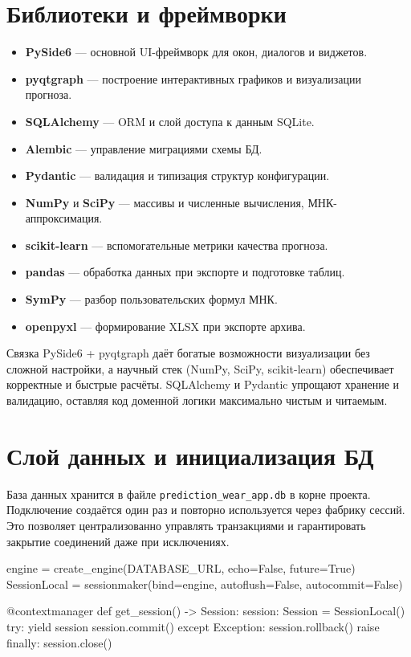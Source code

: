 \documentclass[12pt,a4paper]{article}
\begin{document}
\section*{Библиотеки и фреймворки}
\begin{itemize}
  \item \textbf{PySide6} --- основной UI-фреймворк для окон, диалогов и виджетов.
  \item \textbf{pyqtgraph} --- построение интерактивных графиков и визуализации прогноза.
  \item \textbf{SQLAlchemy} --- ORM и слой доступа к данным SQLite.
  \item \textbf{Alembic} --- управление миграциями схемы БД.
  \item \textbf{Pydantic} --- валидация и типизация структур конфигурации.
  \item \textbf{NumPy} и \textbf{SciPy} --- массивы и численные вычисления, МНК-аппроксимация.
  \item \textbf{scikit-learn} --- вспомогательные метрики качества прогноза.
  \item \textbf{pandas} --- обработка данных при экспорте и подготовке таблиц.
  \item \textbf{SymPy} --- разбор пользовательских формул МНК.
  \item \textbf{openpyxl} --- формирование XLSX при экспорте архива.
\end{itemize}
Связка PySide6 + pyqtgraph даёт богатые возможности визуализации без сложной настройки,
а научный стек (NumPy, SciPy, scikit-learn) обеспечивает корректные и быстрые расчёты.
SQLAlchemy и Pydantic упрощают хранение и валидацию, оставляя код доменной логики
максимально чистым и читаемым.

\section*{Слой данных и инициализация БД}
База данных хранится в файле \texttt{prediction\_wear\_app.db} в корне проекта.
Подключение создаётся один раз и повторно используется через фабрику сессий.
Это позволяет централизованно управлять транзакциями и гарантировать
закрытие соединений даже при исключениях.

\begin{codeblock}
engine = create_engine(DATABASE_URL, echo=False, future=True)
SessionLocal = sessionmaker(bind=engine, autoflush=False, autocommit=False)

@contextmanager
def get_session() -> Session:
    session: Session = SessionLocal()
    try:
        yield session
        session.commit()
    except Exception:
        session.rollback()
        raise
    finally:
        session.close()
\end{codeblock}
\end{document}

